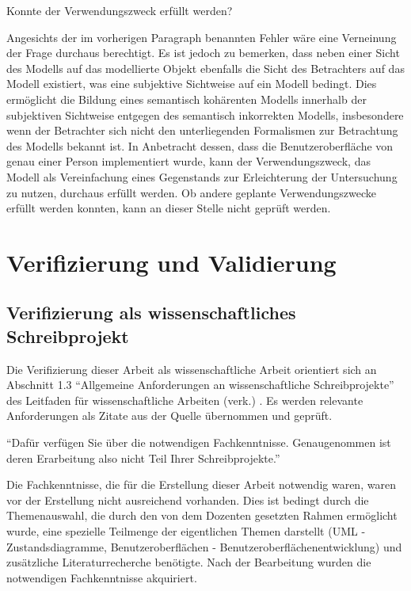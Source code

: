 \documentclass[first=Christoph,last=Hoentzsch,company=Softwareprojekt,location=Dresden,simple, noheader]{baarticle}
\begin{document}
\begin{basimple}
    Konnte der Verwendungszweck erfüllt werden?

    Angesichts der im vorherigen Paragraph benannten Fehler wäre eine Verneinung der Frage durchaus berechtigt. 
    Es ist jedoch zu bemerken, dass neben einer Sicht des Modells auf das modellierte Objekt ebenfalls die Sicht des Betrachters auf das Modell existiert, was eine subjektive Sichtweise auf ein Modell bedingt.
    Dies ermöglicht die Bildung eines semantisch kohärenten Modells innerhalb der subjektiven Sichtweise entgegen des semantisch inkorrekten Modells, insbesondere wenn der Betrachter sich nicht den unterliegenden Formalismen zur Betrachtung des Modells bekannt ist.
    In Anbetracht dessen, dass die Benutzeroberfläche von genau einer Person implementiert wurde, kann der Verwendungszweck, das Modell als Vereinfachung eines Gegenstands zur Erleichterung der Untersuchung zu nutzen, durchaus erfüllt werden.
    Ob andere geplante Verwendungszwecke erfüllt werden konnten, kann an dieser Stelle nicht geprüft werden.

    \newpage
    \section{Verifizierung und Validierung} \label{sec:vnv}
        \subsection{Verifizierung als wissenschaftliches Schreibprojekt}
        Die Verifizierung dieser Arbeit als wissenschaftliche Arbeit orientiert sich an Abschnitt 1.3 \enquote{Allgemeine Anforderungen an wissenschaftliche Schreibprojekte} des Leitfaden für wissenschaftliche Arbeiten (verk.) . Es werden relevante Anforderungen als Zitate aus der Quelle übernommen und geprüft.

        \enquote{Dafür verfügen Sie über die notwendigen Fachkenntnisse. Genaugenommen ist deren Erarbeitung also nicht Teil Ihrer Schreibprojekte.}

        Die Fachkenntnisse, die für die Erstellung dieser Arbeit notwendig waren, waren vor der Erstellung nicht ausreichend vorhanden.
        Dies ist bedingt durch die Themenauswahl, die durch den von dem Dozenten gesetzten Rahmen ermöglicht wurde, eine spezielle Teilmenge der eigentlichen Themen darstellt (UML - Zustandsdiagramme, Benutzeroberflächen - Benutzeroberflächenentwicklung) und zusätzliche Literaturrecherche benötigte.
        Nach der Bearbeitung wurden die notwendigen Fachkenntnisse akquiriert.


\end{basimple}
\end{document}
